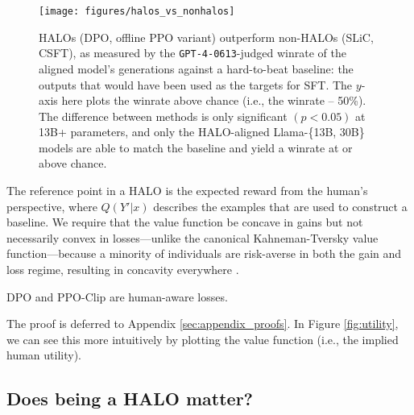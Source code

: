 \begin{figure*}[t]
    \centering
    \texttt{[image: figures/halos\_vs\_nonhalos]}
    \vspace{-15pt}
    \caption{HALOs (DPO, offline PPO variant) outperform non-HALOs (SLiC, CSFT), as measured by the \texttt{GPT-4-0613}-judged winrate of the aligned model's generations against a hard-to-beat baseline: the outputs that would have been used as the targets for SFT.
    The $y$-axis here plots the winrate above chance (i.e., the winrate -- 50\%).
    The difference between methods is only significant $(p < 0.05)$ at 13B+ parameters, and only the HALO-aligned Llama-\{13B, 30B\} models are able to match the baseline and yield a winrate at or above chance.}
    \label{fig:halos_vs_nonhalos}
\end{figure*}

The reference point in a HALO is the expected reward from the human's perspective, where $Q(Y'|x)$ describes the examples that are used to construct a baseline.
We require that the value function be concave in gains but not necessarily convex in losses---unlike the canonical Kahneman-Tversky value function---because a minority of individuals are risk-averse in both the gain and loss regime, resulting in concavity everywhere \citep{kahneman1979prospect}.

\begin{theorem}
\label{theorem:halos}
    DPO and PPO-Clip are human-aware losses.
\end{theorem}
The proof is deferred to Appendix \ref{sec:appendix_proofs}.
In Figure \ref{fig:utility}, we can see this more intuitively by plotting the value function (i.e., the implied human utility).

\subsection{Does being a HALO matter?}
\label{ssec:do_halos_matter}

